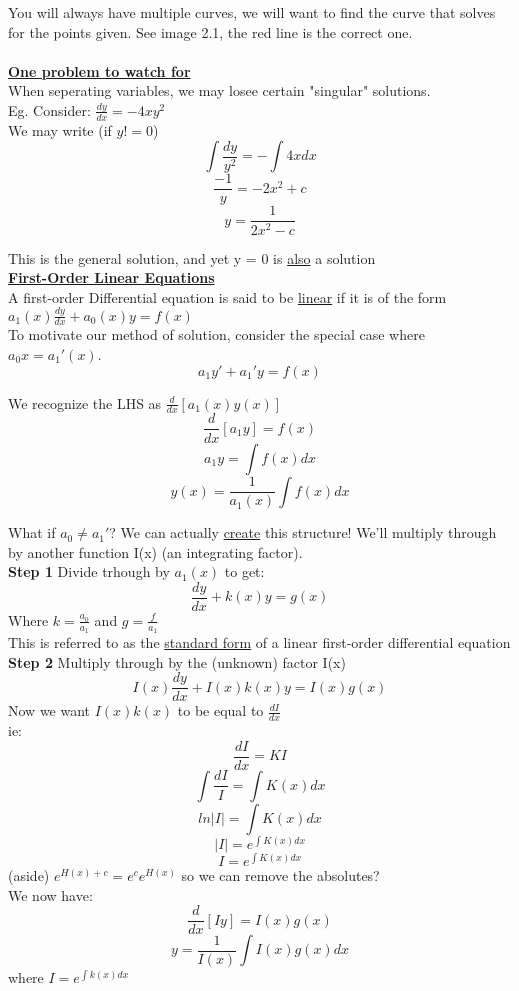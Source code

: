 \documentclass[12pt]{article}
\newcommand{\myt}[1]{\textbf{\underline{#1}}}
\begin{document}
	You will always have multiple curves, we will want to find the curve that solves for the points given. See image 2.1, the red line is the correct one.\\\\
	
	\myt{One problem to watch for}\\
	
	When seperating variables, we may losee certain "singular" solutions.\\
	Eg. Consider: $\frac{dy}{dx} = -4xy^2$\\
	We may write (if $y != 0$)\\
	$$\int \frac{dy}{y^2} = -\int 4xdx$$
	$$\frac{-1}{y} = -2x^2 + c$$
	$$y = \frac{1}{2x^2-c}$$
	
	This is the general solution, and yet y = 0 is \underline{also} a solution\\
	
	\myt{First-Order Linear Equations}\\
	
	A first-order Differential equation is said to be \underline{linear} if it is of the form $a_1(x)\frac{dy}{dx} + a_0(x)y = f(x)$\\
	
	To motivate our method of solution, consider the special case where $a_0x = a_1'(x)$. 
	$$a_1y' + a_1'y = f(x)$$
	
	We recognize the LHS as $\frac{d}{dx}[a_1(x)y(x)]$\\
	$$\frac{d}{dx}[a_1y] = f(x)$$
	$$a_1y = \int f(x)dx$$
	$$y(x) = \frac{1}{a_1(x)}\int f(x)dx$$
	
	What if $a_0 \ne a_1'$? We can actually \underline{create} this structure! We'll multiply through by another function I(x) (an integrating factor).\\
	\textbf{Step 1} Divide trhough by $a_1(x)$ to get:\\
	$$\frac{dy}{dx} + k(x)y = g(x)$$
	Where $k = \frac{a_0}{a_1}$ and $g = \frac{f}{a_1}$\\
	This is referred to as the \underline{standard form} of a linear first-order differential equation\\
	
	\textbf{Step 2} Multiply through by the (unknown) factor I(x)\\
	$$I(x)\frac{dy}{dx} + I(x)k(x)y = I(x)g(x)$$
	Now we want $I(x)k(x)$ to be equal to $\frac{dI}{dx}$\\
	ie:
	$$ \frac{dI}{dx} = KI$$
	$$\int\frac{dI}{I} = \int K(x)dx$$
	$$ln|I| = \int K(x)dx$$
	$$|I| = e^{\int K(x)dx}$$
	$$I = e^{\int K(x)dx}$$
	(aside) $e^{H(x) + c} = e^ce^{H(x)}$ so we can remove the absolutes?\\
	We now have:\\
	$$\frac{d}{dx}[Iy] = I(x)g(x)$$
	$$y = \frac{1}{I(x)}\int I(x)g(x)dx$$
	where $I = e^{\int k(x)dx}$\\
	
\end{document}
